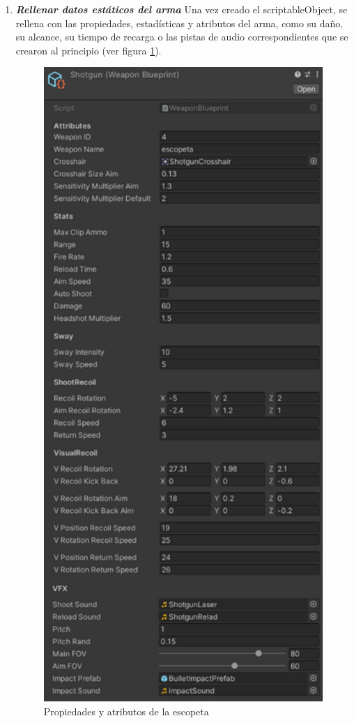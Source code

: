 \begin{enumerate}
    \item \textbf{\textit{Rellenar datos estáticos del arma}}
    Una vez creado el scriptableObject, se rellena con las propiedades, estadísticas y atributos del arma, como su daño, su alcance, su tiempo de recarga o las pistas de audio correspondientes que se crearon al principio (ver figura \ref{fig:PropiedadesEscopeta}).
    
    \begin{figure}[h]
    \centering
    \includegraphics[scale=0.5]{img/ShotgunProperties.jpg}
    \caption{Propiedades y atributos de la escopeta}
    \label{fig:PropiedadesEscopeta}
    \end{figure}
    

\end{enumerate}
